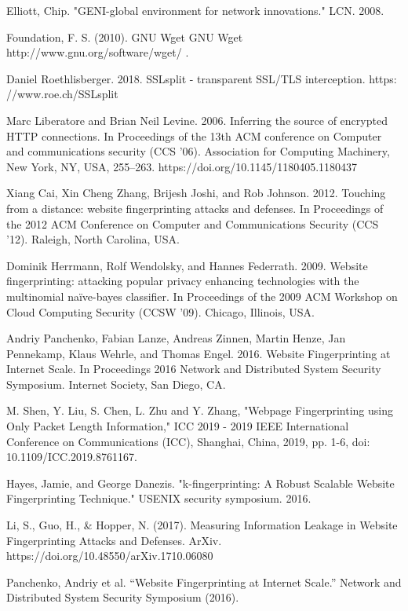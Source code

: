 \begin{thebibliography}{1}
Elliott, Chip. "GENI-global environment for network innovations." LCN. 2008.

Foundation, F. S. (2010). GNU Wget GNU Wget http://www.gnu.org/software/wget/ .

Daniel Roethlisberger. 2018. SSLsplit - transparent SSL/TLS interception. https: //www.roe.ch/SSLsplit

Marc Liberatore and Brian Neil Levine. 2006. Inferring the source of encrypted HTTP connections. In Proceedings of the 13th ACM conference on Computer and communications security (CCS '06). Association for Computing Machinery, New York, NY, USA, 255–263. https://doi.org/10.1145/1180405.1180437

Xiang Cai, Xin Cheng Zhang, Brijesh Joshi, and Rob Johnson. 2012. Touching from a distance: website fingerprinting attacks and defenses. In Proceedings of the 2012 ACM Conference on Computer and Communications Security (CCS ’12). Raleigh, North Carolina, USA.

Dominik Herrmann, Rolf Wendolsky, and Hannes Federrath. 2009. Website fingerprinting: attacking popular privacy enhancing technologies with the multinomial naïve-bayes classifier. In Proceedings of the 2009 ACM Workshop on Cloud Computing Security (CCSW ’09). Chicago, Illinois, USA.

Andriy Panchenko, Fabian Lanze, Andreas Zinnen, Martin Henze, Jan Pennekamp, Klaus Wehrle, and Thomas Engel. 2016. Website Fingerprinting at Internet Scale. In Proceedings 2016 Network and Distributed System Security Symposium. Internet Society, San Diego, CA.

M. Shen, Y. Liu, S. Chen, L. Zhu and Y. Zhang, "Webpage Fingerprinting using Only Packet Length Information," ICC 2019 - 2019 IEEE International Conference on Communications (ICC), Shanghai, China, 2019, pp. 1-6, doi: 10.1109/ICC.2019.8761167.

Hayes, Jamie, and George Danezis. "k-fingerprinting: A Robust Scalable Website Fingerprinting Technique." USENIX security symposium. 2016.

Li, S., Guo, H., \& Hopper, N. (2017). Measuring Information Leakage in Website Fingerprinting Attacks and Defenses. ArXiv. https://doi.org/10.48550/arXiv.1710.06080

Panchenko, Andriy et al. “Website Fingerprinting at Internet Scale.” Network and Distributed System Security Symposium (2016).


\end{thebibliography}
